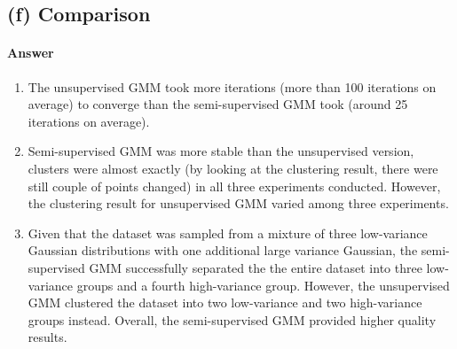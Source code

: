 \documentclass[11pt]{article}
\begin{document}
	\newpage
	\subsection{(f) Comparison}
	\paragraph{Answer}
	\begin{enumerate}
		\item The unsupervised GMM took more iterations (more than 100 iterations on average) to converge than the semi-supervised GMM took (around 25 iterations on average).
		\item Semi-supervised GMM was more stable than the unsupervised version, clusters were almost exactly (by looking at the clustering result, there were still couple of points changed) in all three experiments conducted. However, the clustering result for unsupervised GMM varied among three experiments.
		\item Given that the dataset was sampled from a mixture of three low-variance Gaussian distributions with one additional large variance Gaussian, the semi-supervised GMM successfully separated the the entire dataset into three low-variance groups and a fourth high-variance group. However, the unsupervised GMM clustered the dataset into two low-variance and two high-variance groups instead. Overall, the semi-supervised GMM provided higher quality results.
	\end{enumerate}
	
	\newpage
\end{document}
